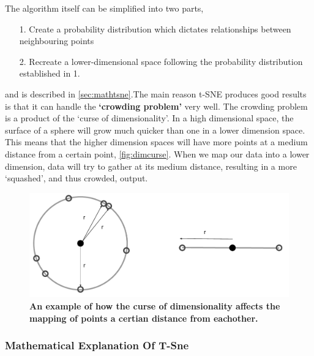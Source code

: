 The algorithm itself can be simplified into two parts,

\begin{itemize}
  \item [1.] Create a probability distribution which dictates relationships between neighbouring points
  \item [2.] Recreate a lower-dimensional space following the probability distribution established in 1.
\end{itemize}

and is described in \autoref{sec:mathtsne}.The main reason t-SNE produces good results is that it can handle the \textbf{`crowding problem'} very well. The crowding problem is a product of the `curse of dimensionality'. In a high dimensional space, the surface of a sphere will grow much quicker than one in a lower dimension space. This means that the higher dimension spaces will have more points at a medium distance from a certain point, \autoref{fig:dimcurse}. When we map our data into a lower dimension, data will try to gather at its medium distance, resulting in a more `squashed', and thus crowded, output.



\begin{figure}[H]
  \centering
\includegraphics[width=.5\textwidth]{4fig/dimcurse.pdf}
\caption{\textbf{An example of how the curse of dimensionality affects the mapping of points a certian distance from eachother.} }\label{fig:dimcurse}
\end{figure}




\subsubsection{Mathematical Explanation Of T-Sne}\label{sec:mathtsne}

%

